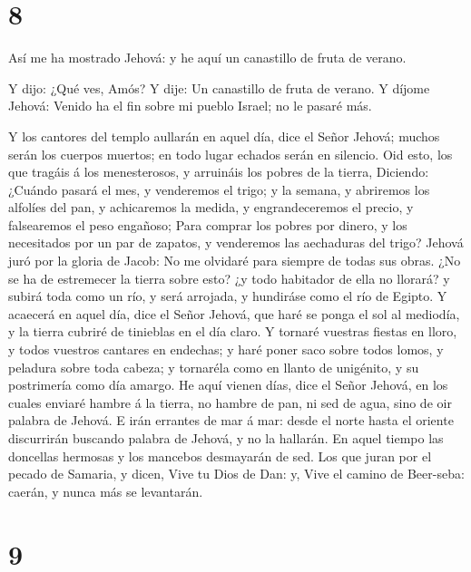 \hypertarget{section-7}{%
\section{8}\label{section-7}}

 Así me ha mostrado Jehová: y he aquí un canastillo de fruta
de verano.

 Y dijo: ¿Qué ves, Amós? Y dije: Un canastillo de fruta de
verano. Y díjome Jehová: Venido ha el fin sobre mi pueblo Israel; no le
pasaré más.

 Y los cantores del templo aullarán en aquel día, dice el
Señor Jehová; muchos serán los cuerpos muertos; en todo lugar echados
serán en silencio.  Oid esto, los que tragáis á los
menesterosos, y arruináis los pobres de la tierra, 
Diciendo: ¿Cuándo pasará el mes, y venderemos el trigo; y la semana, y
abriremos los alfolíes del pan, y achicaremos la medida, y
engrandeceremos el precio, y falsearemos el peso engañoso; 
Para comprar los pobres por dinero, y los necesitados por un par de
zapatos, y venderemos las aechaduras del trigo?  Jehová juró
por la gloria de Jacob: No me olvidaré para siempre de todas sus obras.
 ¿No se ha de estremecer la tierra sobre esto? ¿y todo
habitador de ella no llorará? y subirá toda como un río, y será
arrojada, y hundiráse como el río de Egipto.  Y acaecerá en
aquel día, dice el Señor Jehová, que haré se ponga el sol al mediodía, y
la tierra cubriré de tinieblas en el día claro.  Y tornaré
vuestras fiestas en lloro, y todos vuestros cantares en endechas; y haré
poner saco sobre todos lomos, y peladura sobre toda cabeza; y tornaréla
como en llanto de unigénito, y su postrimería como día amargo.
 He aquí vienen días, dice el Señor Jehová, en los cuales
enviaré hambre á la tierra, no hambre de pan, ni sed de agua, sino de
oir palabra de Jehová.  E irán errantes de mar á mar: desde
el norte hasta el oriente discurrirán buscando palabra de Jehová, y no
la hallarán.  En aquel tiempo las doncellas hermosas y los
mancebos desmayarán de sed.  Los que juran por el pecado de
Samaria, y dicen, Vive tu Dios de Dan: y, Vive el camino de Beer-seba:
caerán, y nunca más se levantarán.

\hypertarget{section-8}{%
\section{9}\label{section-8}}


